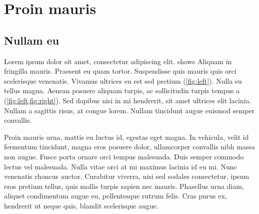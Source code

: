 \section{Proin mauris}\label{sec:proin}

\subsection{Nullam eu}\label{subsec:nullam}

Lorem ipsum dolor sit amet, consectetur adipiscing elit.
 shows Aliquam in fringilla mauris.
Praesent eu quam tortor.
Suspendisse quis mauris quis orci scelerisque venenatis.
Vivamus ultrices eu est sed pretium (\cref{fig:left}).
Nulla eu tellus magna. Aenean posuere aliquam turpis,
ac sollicitudin turpis tempus a (\cref{fig:left,fig:right}).
Sed dapibus nisi in mi hendrerit, sit amet ultrices elit lacinia.
Nullam a sagittis risus, at congue lorem.
Nullam tincidunt augue euismod semper convallis.

Proin mauris urna, mattis eu luctus id, egestas eget magna.
In vehicula, velit id fermentum tincidunt, magna eros posuere dolor,
ullamcorper convallis nibh massa non augue.
Fusce porta ornare orci tempus malesuada.
Duis semper commodo lectus vel malesuada.
Nulla vitae orci at mi maximus lacinia id eu mi.
Nunc venenatis rhoncus auctor.
Curabitur viverra, nisi sed sodales consectetur, ipsum eros pretium tellus,
quis mollis turpis sapien nec mauris.
Phasellus urna diam, aliquet condimentum augue eu, pellentesque rutrum felis. Cras purus ex, hendrerit ut neque quis, blandit scelerisque augue.

